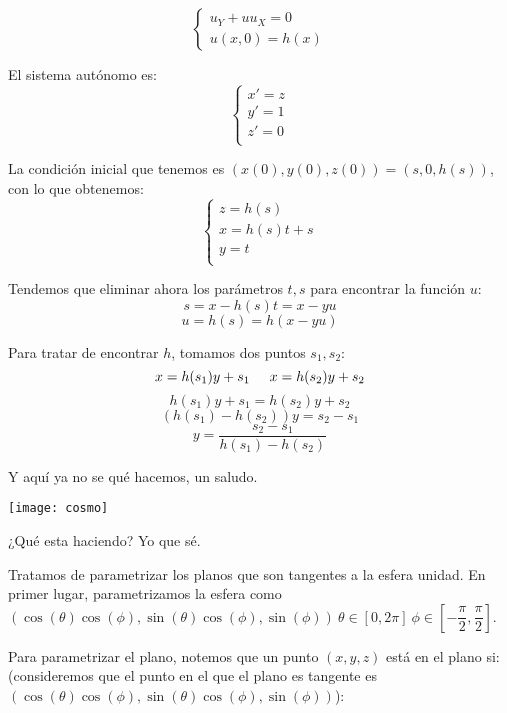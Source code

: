 \documentclass[openany]{book}
\begin{document}
\begin{example}
  $$ \left\{
  \begin{array}{l}
    u_{Y} + u u_{X} = 0\\ 
    u(x,0) = h(x)
  \end{array}
  \right. $$

  El sistema autónomo es:
  $$ \left\{
  \begin{array}{ll}
    x' = z\\ 
    y' = 1\\ 
    z' = 0\\ 

  \end{array}
  \right. $$

  La condición inicial que tenemos es $ (x(0),y(0),z(0)) = (s,0,h(s)) $, con lo que obtenemos:
  $$ \left\{
  \begin{array}{l}
    z = h(s)\\ 
    x = h(s)t+s\\ 
    y = t\\ 
  \end{array}
  \right. $$

  Tendemos que eliminar ahora los parámetros $ t,s $ para encontrar la función $ u $:
  $$ s = x-h(s)t = x-yu $$
  $$ u = h(s) = h(x-yu) $$

  Para tratar de encontrar $ h $, tomamos dos puntos $ s_1,s_2 $:
  $$ x = h(s_1)y+s_1 \hspace{5mm} x = h(s_2)y+s_2 $$
  $$ h(s_1)y+s_1 = h(s_2)y+s_2 $$
  $$ (h(s_1)-h(s_2))y = s_2-s_1 $$
  $$ y = \dfrac{s_2-s_1}{h(s_1)-h(s_2)} $$
  
  Y aquí ya no se qué hacemos, un saludo.
\end{example}



\begin{minipage}[l]{0.1\textwidth}
  \texttt{[image: cosmo]}
  \end{minipage}
  \begin{minipage}[l]{0.8\textwidth}
  ¿Qué esta haciendo? Yo que sé.
  \end{minipage}
 
Tratamos de parametrizar los planos que son tangentes a la esfera unidad. En primer lugar, parametrizamos la esfera como $ (\cos(\theta)\cos(\phi), \sin(\theta)\cos(\phi),\sin(\phi))\ \theta \in [0,2\pi]\ \phi \in [-\dfrac{\pi}{2},\dfrac{\pi}{2}] $.

Para parametrizar el plano, notemos que un punto $ (x,y,z) $ está en el plano si: (consideremos que el punto en el que el plano es tangente es $ (\cos(\theta)\cos(\phi), \sin(\theta)\cos(\phi),\sin(\phi)) $):
\end{document}
